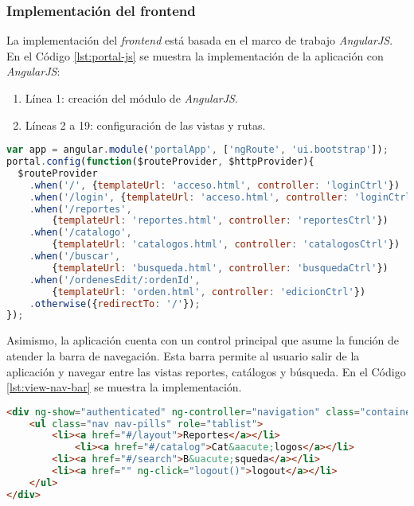 \subsubsection{Implementación del frontend}\label{sec:frontend}
La implementación del \textit{frontend} está basada en el marco de trabajo \textit{AngularJS}. En el Código \ref{lst:portal-js} se muestra la implementación de la aplicación con \textit{AngularJS}:
\begin{enumerate}
	\item Línea 1: creación del módulo de \textit{AngularJS}.
	\item Líneas 2 a 19: configuración de las vistas y rutas.
\end{enumerate}
\begin{lstlisting}[language=Javascript, caption={Módulo de \textit{AngularJS} para el Portal Web.}, captionpos=b, label={lst:portal-js}]
var app = angular.module('portalApp', ['ngRoute', 'ui.bootstrap']);
portal.config(function($routeProvider, $httpProvider){
  $routeProvider
	.when('/', {templateUrl: 'acceso.html', controller: 'loginCtrl'})
	.when('/login', {templateUrl: 'acceso.html', controller: 'loginCtrl'})
	.when('/reportes',
		{templateUrl: 'reportes.html', controller: 'reportesCtrl'})
	.when('/catalogo',
		{templateUrl: 'catalogos.html', controller: 'catalogosCtrl'})
	.when('/buscar',
		{templateUrl: 'busqueda.html', controller: 'busquedaCtrl'})
	.when('/ordenesEdit/:ordenId',
		{templateUrl: 'orden.html', controller: 'edicionCtrl'})
	.otherwise({redirectTo: '/'});
});
\end{lstlisting}

Asimismo, la aplicación cuenta con un control principal que asume la función de atender la barra de navegación. Esta barra permite al usuario salir de la aplicación y navegar entre las vistas reportes, catálogos y búsqueda. En el Código \ref{lst:view-nav-bar} se muestra la implementación.

\begin{lstlisting}[language=HTML, captionpos=b, caption={Barra de navegación.}, label={lst:view-nav-bar}]
<div ng-show="authenticated" ng-controller="navigation" class="container">
	<ul class="nav nav-pills" role="tablist">
		<li><a href="#/layout">Reportes</a></li>
			<li><a href="#/catalog">Cat&aacute;logos</a></li> 
		<li><a href="#/search">B&uacute;squeda</a></li>
		<li><a href="" ng-click="logout()">logout</a></li>
	</ul>
</div>
\end{lstlisting}

